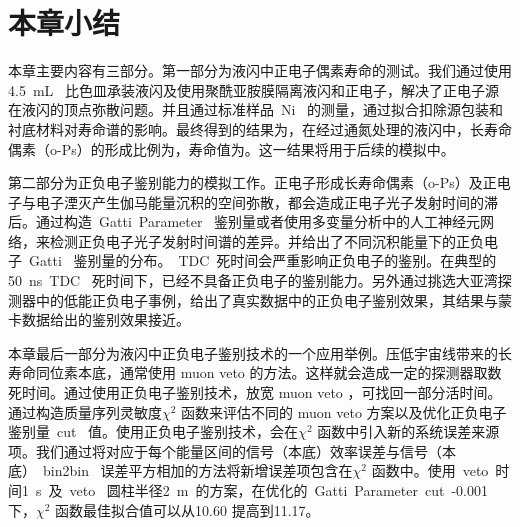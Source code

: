 \section{本章小结}
本章主要内容有三部分。第一部分为液闪中正电子偶素寿命的测试。我们通过使用4.5~mL~ 比色皿承装液闪及使用聚酰亚胺膜隔离液闪和正电子，解决了正电子源在液闪的顶点弥散问题。并且通过标准样品~Ni~ 的测量，通过拟合扣除源包装和衬底材料对寿命谱的影响。最终得到的结果为，在经过通氮处理的液闪中，长寿命偶素（o-Ps）的形成比例为，寿命值为。这一结果将用于后续的模拟中。

第二部分为正负电子鉴别能力的模拟工作。正电子形成长寿命偶素（o-Ps）及正电子与电子湮灭产生伽马能量沉积的空间弥散，都会造成正电子光子发射时间的滞后。通过构造~Gatti~Parameter~ 鉴别量或者使用多变量分析中的人工神经元网络，来检测正负电子光子发射时间谱的差异。并给出了不同沉积能量下的正负电子~Gatti~ 鉴别量的分布。~TDC~死时间会严重影响正负电子的鉴别。在典型的50~ns~TDC~ 死时间下，已经不具备正负电子的鉴别能力。另外通过挑选大亚湾探测器中的低能正负电子事例，给出了真实数据中的正负电子鉴别效果，其结果与蒙卡数据给出的鉴别效果接近。

本章最后一部分为液闪中正负电子鉴别技术的一个应用举例。压低宇宙线带来的长寿命同位素本底，通常使用 muon veto 的方法。这样就会造成一定的探测器取数死时间。通过使用正负电子鉴别技术，放宽 muon veto ，可找回一部分活时间。通过构造质量序列灵敏度$\chi^2$ 函数来评估不同的 muon veto 方案以及优化正负电子鉴别量~cut~ 值。使用正负电子鉴别技术，会在$\chi^2$ 函数中引入新的系统误差来源项。我们通过将对应于每个能量区间的信号（本底）效率误差与信号（本底）~bin2bin~ 误差平方相加的方法将新增误差项包含在$\chi^2$ 函数中。使用~veto~时间1~s~及~veto~ 圆柱半径2~m~的方案，在优化的~Gatti~Parameter~cut~-0.001 下，$\chi^2$ 函数最佳拟合值可以从10.60 提高到11.17。

